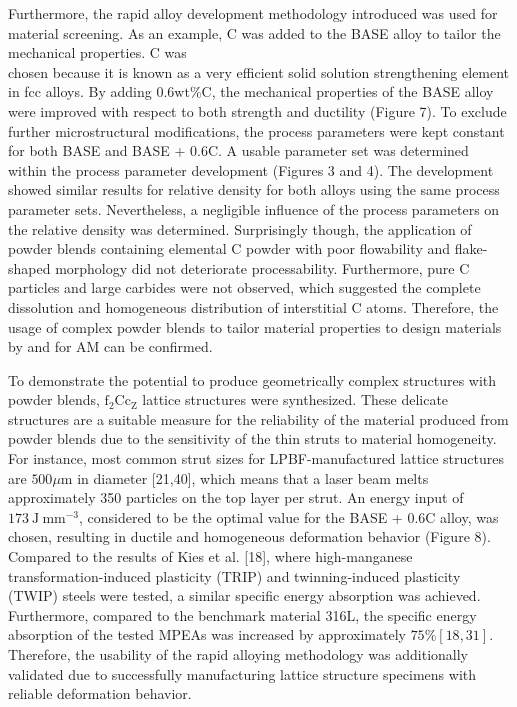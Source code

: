\documentclass[10pt]{article}
\begin{document}
Furthermore, the rapid alloy development methodology introduced was used for material screening. As an example, $\mathrm{C}$ was added to the BASE alloy to tailor the mechanical properties. $\mathrm{C}$ was\\
chosen because it is known as a very efficient solid solution strengthening element in fcc alloys. By adding $0.6 \mathrm{wt} \% \mathrm{C}$, the mechanical properties of the BASE alloy were improved with respect to both strength and ductility (Figure 7). To exclude further microstructural modifications, the process parameters were kept constant for both BASE and BASE + 0.6C. A usable parameter set was determined within the process parameter development (Figures 3 and 4). The development showed similar results for relative density for both alloys using the same process parameter sets. Nevertheless, a negligible influence of the process parameters on the relative density was determined. Surprisingly though, the application of powder blends containing elemental $\mathrm{C}$ powder with poor flowability and flake-shaped morphology did not deteriorate processability. Furthermore, pure $\mathrm{C}$ particles and large carbides were not observed, which suggested the complete dissolution and homogeneous distribution of interstitial C atoms. Therefore, the usage of complex powder blends to tailor material properties to design materials by and for AM can be confirmed.

To demonstrate the potential to produce geometrically complex structures with powder blends, $\mathrm{f}_{2} \mathrm{Cc}_{\mathrm{Z}}$ lattice structures were synthesized. These delicate structures are a suitable measure for the reliability of the material produced from powder blends due to the sensitivity of the thin struts to material homogeneity. For instance, most common strut sizes for LPBF-manufactured lattice structures are $500 \mu \mathrm{m}$ in diameter [21,40], which means that a laser beam melts approximately 350 particles on the top layer per strut. An energy input of $173 \mathrm{~J} \mathrm{~mm}^{-3}$, considered to be the optimal value for the BASE + 0.6C alloy, was chosen, resulting in ductile and homogeneous deformation behavior (Figure 8). Compared to the results of Kies et al. [18], where high-manganese transformation-induced plasticity (TRIP) and twinning-induced plasticity (TWIP) steels were tested, a similar specific energy absorption was achieved. Furthermore, compared to the benchmark material 316L, the specific energy absorption of the tested MPEAs was increased by approximately $75 \%[18,31]$. Therefore, the usability of the rapid alloying methodology was additionally validated due to successfully manufacturing lattice structure specimens with reliable deformation behavior.
\end{document}
